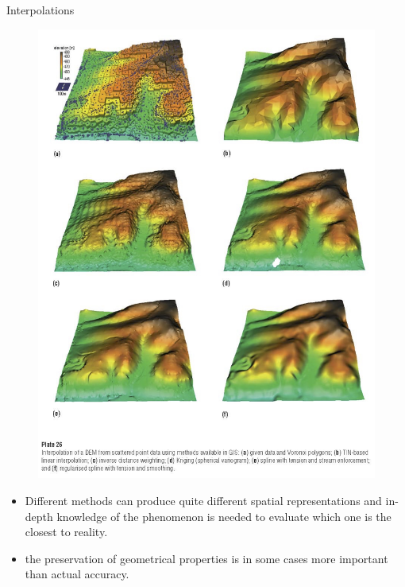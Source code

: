 \documentclass[handout]{beamer} %
\begin{document}
\begin{frame}{Interpolations}
    \begin{minipage}{0.58\textwidth}
        \begin{figure}
            \centering
            \includegraphics[width=\textwidth]{img/appendix/Aim2/interpolation.jpg}
        \end{figure}
    \end{minipage}
    \begin{minipage}{0.38\textwidth}
        \small
        \begin{itemize}
            \item Different methods can produce quite different spatial representations and in-depth knowledge of the phenomenon is needed to evaluate which one is the closest to reality.
            \item the preservation of geometrical properties is in some cases more important than actual accuracy.
        \end{itemize}
    \end{minipage}
\end{frame}
\end{document}
